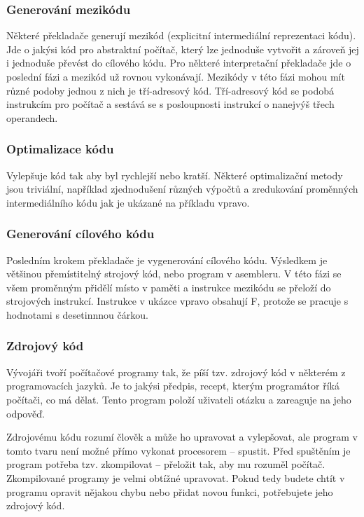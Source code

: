 \subsubsection{Generování mezikódu}
Některé překladače generují mezikód (explicitní intermediální reprezentaci kódu). Jde o jakýsi kód pro abstraktní počítač, který lze jednoduše vytvořit a zároveň jej i jednoduše převést do cílového kódu. Pro některé interpretační překladače jde o poslední fázi a mezikód už rovnou vykonávají. Mezikódy v této fázi mohou mít různé podoby jednou z nich je tří-adresový kód. Tří-adresový kód se podobá instrukcím pro počítač a sestává se s posloupnosti instrukcí o nanejvýš třech operandech.

\subsubsection{Optimalizace kódu}
Vylepšuje kód tak aby byl rychlejší nebo kratší. Některé optimalizační metody jsou triviální, například zjednodušení různých výpočtů a zredukování proměnných intermediálního kódu jak je ukázané na příkladu vpravo.

\subsubsection{Generování cílového kódu}
Posledním krokem překladače je vygenerování cílového kódu. Výsledkem je většinou přemístitelný strojový kód, nebo program v asembleru. V této fázi se všem proměnným přidělí místo v paměti a instrukce mezikódu se přeloží do strojových instrukcí. Instrukce v ukázce vpravo obsahují F, protože se pracuje s hodnotami s desetinnnou čárkou.

\subsubsection{Zdrojový kód}
Vývojáři tvoří počítačové programy tak, že píší tzv. zdrojový kód v některém z programovacích jazyků. Je to jakýsi předpis, recept, kterým programátor říká počítači, co má dělat.
Tento program položí uživateli otázku a zareaguje na jeho odpověď.

Zdrojovému kódu rozumí člověk a může ho upravovat a vylepšovat, ale program v tomto tvaru není možné přímo vykonat procesorem – spustit. Před spuštěním je program potřeba tzv. zkompilovat – přeložit tak, aby mu rozuměl počítač. Zkompilované programy je velmi obtížné upravovat. Pokud tedy budete chtít v programu opravit nějakou chybu nebo přidat novou funkci, potřebujete jeho zdrojový kód.


